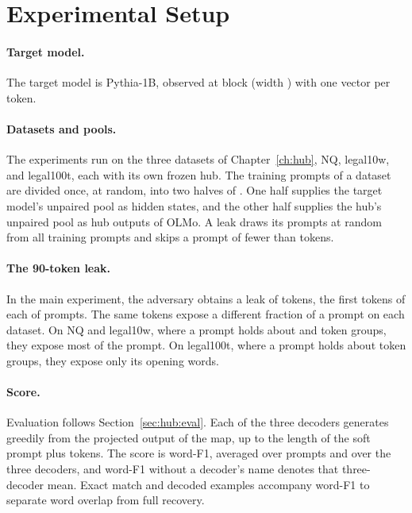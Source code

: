\section{Experimental Setup}\label{sec:attack:experiments}

\paragraph{Target model.} The target model is Pythia-1B, observed at block  (width ) with one vector per token.

\paragraph{Datasets and pools.} The experiments run on the three datasets of Chapter~\ref{ch:hub}, NQ, legal10w, and legal100t, each with its own frozen hub.
The  training prompts of a dataset are divided once, at random, into two halves of .
One half supplies the target model's unpaired pool as hidden states, and the other half supplies the hub's unpaired pool as hub outputs of OLMo. 
A leak draws its prompts at random from all  training prompts and skips a prompt of fewer than  tokens.

\paragraph{The 90-token leak.} In the main experiment, the adversary obtains a leak of  tokens, the first  tokens of each of  prompts.
The same  tokens expose a different fraction of a prompt on each dataset.
On NQ and legal10w, where a prompt holds about  and  token groups, they expose most of the prompt.
On legal100t, where a prompt holds about  token groups, they expose only its opening words.

\paragraph{Score.} Evaluation follows Section~\ref{sec:hub:eval}.
Each of the three decoders generates greedily from the projected output of the map, up to the length of the soft prompt plus  tokens.
The score is word-F1, averaged over prompts and over the three decoders, and word-F1 without a decoder's name denotes that three-decoder mean.
Exact match and decoded examples accompany word-F1 to separate word overlap from full recovery. 

